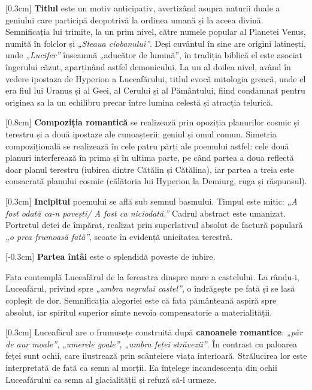 \documentclass[
12pt,                        %
a4paper                      %
]{article}
\begin{document}
[0.3cm]
\textbf{Titlul} este un motiv anticipativ, avertizând asupra naturii duale a geniului care participă deopotrivă la ordinea umană și la aceea divină. Semnificația lui trimite, la un prim nivel, către numele popular al Planetei Venus, numită în folclor și \textit{„Steaua ciobanului”}. Deși cuvântul în sine are origini latinești, unde \textit{„Lucifer”} înseamnă „aducător de lumină”, în tradiția biblică el este asociat îngerului căzut, aparținând astfel demonicului. La un al doilea nivel, având în vedere ipostaza de Hyperion a Luceafărului, titlul evocă mitologia greacă, unde el era fiul lui Uranus și al Geei, al Cerului și al Pământului, fiind condamnat pentru originea sa la un echilibru precar între lumina celestă și atracția telurică.

[0.8cm]
\textbf{Compoziția romantică} se realizează prin opoziția planurilor cosmic și terestru și a două ipostaze ale cunoașterii: geniul și omul comun. Simetria compozițională se realizează în cele patru părți ale poemului astfel: cele două planuri interferează în prima și în ultima parte, pe când partea a doua reflectă doar planul terestru (iubirea dintre Cătălin și Cătălina), iar partea a treia este consacrată planului cosmic (călătoria lui Hyperion la Demiurg, ruga și răspunsul).

[0.3cm]
\textbf{Incipitul} poemului se află sub semnul basmului. Timpul este mitic: \textit{„A fost odată ca-n povești/ A fost ca niciodată.”} Cadrul abstract este umanizat. Portretul detei de împărat, realizat prin superlativul absolut de factură populară \textit{„o prea frumoasă fată”}, scoate în evidență unicitatea terestră.

[-0.3cm]
\textbf{Partea întâi} este o splendidă poveste de iubire.

Fata contemplă Luceafărul de la fereastra dinspre mare a castelului. La rându-i, Luceafărul, privind spre \textit{„umbra negrului castel”}, o îndrăgește pe fată și se lasă copleșit de dor. Semnificația alegoriei este că fata pământeană aspiră spre absolut, iar spiritul superior simte nevoia compensatorie a materialității.

[0.3cm]
Luceafărul are o frumusețe construită după \textbf{canoanele romantice}: \textit{„păr de aur moale”}, \textit{„umerele goale”}, \textit{„umbra feței străvezii”}. În contrast cu paloarea feței sunt ochii, care ilustrează prin scânteiere viața interioară. Strălucirea lor este interpretată de fată ca semn al morții. Ea înțelege incandescența din ochii Luceafărului ca semn al glacialității și refuză să-l urmeze.
\end{document}
